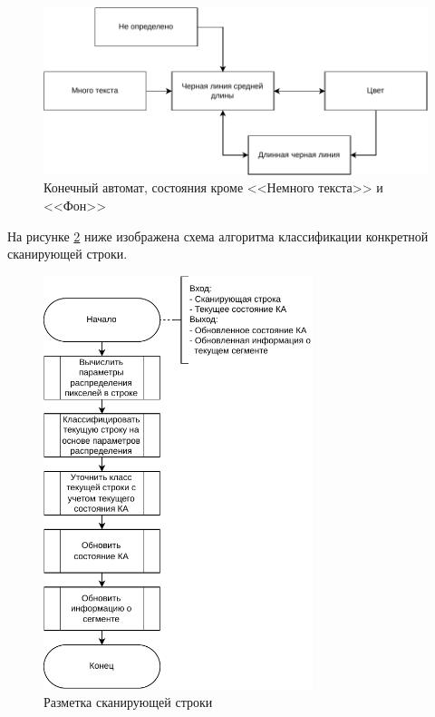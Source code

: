 \begin{figure}[H]
	\centering
	\includegraphics[width=\textwidth]{diag/fsm.slim.pdf}
	\caption{Конечный автомат, состояния кроме <<Немного текста>> и <<Фон>>}
	\label{fig:fsm-slim}
\end{figure}

На рисунке \ref{fig:primary-markup} ниже изображена схема алгоритма классификации конкретной сканирующей строки.

\begin{figure}[H]
	\centering
	\includegraphics[width=0.7\textwidth]{diag/primary-markup.pdf}
	\caption{Разметка сканирующей строки}
	\label{fig:primary-markup}
\end{figure}

